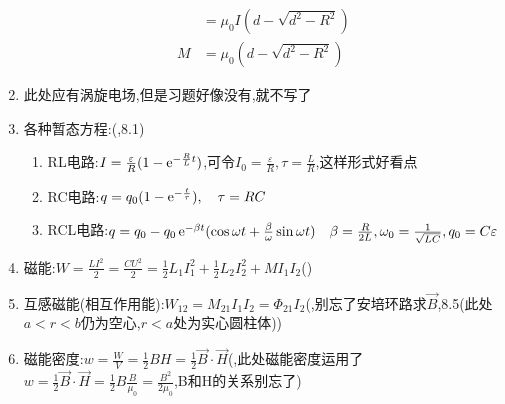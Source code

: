 \documentclass{article}
\begin{document}
\begin{enumerate}[label=\arabic*.]
\[\begin{aligned}
          &= \mu_0 I(d-\sqrt{d^2-R^2})\\
          M &= \mu_0(d-\sqrt{d^2-R^2})
        \end{aligned}\]
  \item 此处应有涡旋电场,但是习题好像没有,就不写了
  \item 各种暂态方程:\quad ({,8.1})
        \begin{enumerate}[label=(\alph*)]
          \item RL电路:$I=\frac{\varepsilon}{R}(1-\operatorname{e}^{-\frac{R}{L}t})$,可令$I_0=\frac{\varepsilon}{R},\tau=\frac{L}{R}$,这样形式好看点
          \item RC电路:$q=q_0(1-\operatorname{e}^{-\frac{t}{\tau}}),\quad \tau=RC$
          \item RCL电路:$q=q_0-q_0\operatorname{e}^{-\beta t}(\cos \omega t +\frac{\beta}{\omega}\sin \omega t)\quad \beta=\frac{R}{2L},\omega_0=\frac{1}{\sqrt{LC}},q_0=C\varepsilon $
        \end{enumerate}
  \item 磁能:$W=\frac{LI^2}{2}=\frac{CU^2}{2}=\frac{1}{2}L_1 I_1^2+\frac{1}{2}L_2 I_2^2+MI_1 I_2$\quad ({})
  \item 互感磁能(相互作用能):$W_{12}=M_{21}I_1 I_2 = \Phi_{21}I_2$\quad ({,别忘了安培环路求$\vec{B}$,8.5(此处$a<r<b$仍为空心,$r<a$处为实心圆柱体)})
  \item 磁能密度:$w = \frac{W}{V}=\frac{1}{2}BH=\frac{1}{2}\vec{B}\cdot \vec{H}$\quad ({,此处磁能密度运用了$w=\frac{1}{2}\vec{B}\cdot \vec{H}=\frac{1}{2}B \frac{B}{\mu_0}=\frac{B^2}{2\mu_0}$,B和H的关系别忘了})
\end{enumerate}
\end{document}

